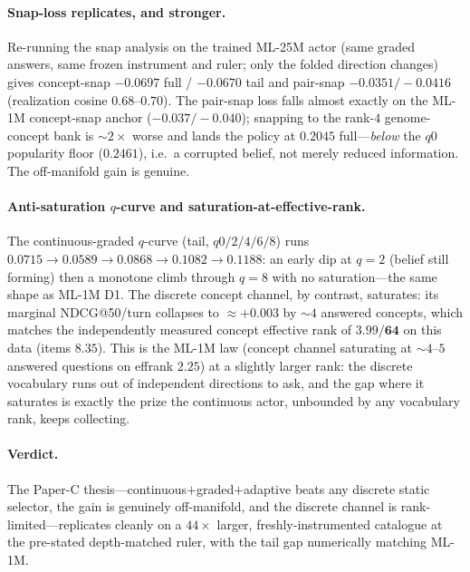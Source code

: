 \documentclass[11pt]{article}
\begin{document}
\paragraph{Snap-loss replicates, and stronger.} Re-running the snap analysis on the trained ML-25M actor (same graded
answers, same frozen instrument and ruler; only the folded direction changes) gives concept-snap
$-0.0697$ full / $-0.0670$ tail and pair-snap $-0.0351/-0.0416$ (realization cosine $0.68$--$0.70$). The
pair-snap loss falls almost exactly on the ML-1M concept-snap anchor ($-0.037/-0.040$); snapping to the rank-$4$
genome-concept bank is $\sim2\times$ worse and lands the policy at $0.2045$ full---\emph{below} the $q0$ popularity floor
($0.2461$), i.e.\ a corrupted belief, not merely reduced information. The off-manifold gain is genuine.

\paragraph{Anti-saturation $q$-curve and saturation-at-effective-rank.} The continuous-graded $q$-curve (tail, $q0/2/4/6/8$)
runs $0.0715\to0.0589\to0.0868\to0.1082\to0.1188$: an early dip at $q{=}2$ (belief still forming) then a monotone climb
through $q{=}8$ with no saturation---the same shape as ML-1M D1. The discrete concept channel, by contrast, saturates:
its marginal NDCG@50/turn collapses to $\approx{+}0.003$ by $\sim4$ answered concepts, which matches the independently
measured concept effective rank of $\mathbf{3.99/64}$ on this data (items $8.35$). This is the ML-1M law
(concept channel saturating at $\sim4$--$5$ answered questions on effrank $2.25$) at a slightly larger rank: the
discrete vocabulary runs out of independent directions to ask, and the gap where it saturates is exactly the prize the
continuous actor, unbounded by any vocabulary rank, keeps collecting.

\paragraph{Verdict.} The Paper-C thesis---continuous$+$graded$+$adaptive beats any discrete static selector, the gain is
genuinely off-manifold, and the discrete channel is rank-limited---replicates cleanly on a $44\times$ larger,
freshly-instrumented catalogue at the pre-stated depth-matched ruler, with the tail gap numerically matching ML-1M.

\end{document}

